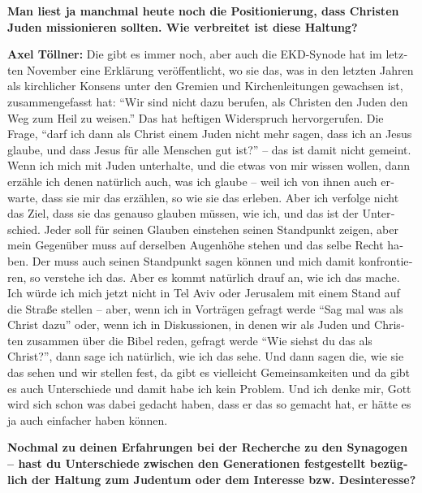 \begin{otherlanguage}{ngerman}
\textbf{Man liest ja manchmal heute noch die Positionierung, dass Christen Juden missionieren sollten. Wie verbreitet ist diese Haltung?} 

\textbf{Axel Töllner:} Die gibt es immer noch, aber auch die EKD-Synode hat im letzten November eine Erklärung veröffentlicht, wo sie das, was in den letzten Jahren als kirchlicher Konsens unter den Gremien und Kirchenleitungen gewachsen ist, zusammengefasst hat: "`Wir sind nicht dazu berufen, als Christen den Juden den Weg zum Heil zu weisen."' Das hat heftigen Widerspruch hervorgerufen. Die Frage, "`darf ich dann als Christ einem Juden nicht mehr sagen, dass ich an Jesus glaube, und dass Jesus für alle Menschen gut ist?"' – das ist damit nicht gemeint. Wenn ich mich mit Juden unterhalte, und die etwas von mir wissen wollen, dann erzähle ich denen natürlich auch, was ich glaube – weil ich von ihnen auch erwarte, dass sie mir das erzählen, so wie sie das erleben. Aber ich verfolge nicht das Ziel, dass sie das genauso glauben müssen, wie ich, und das ist der Unterschied. Jeder soll für seinen Glauben einstehen seinen Standpunkt zeigen, aber mein Gegenüber muss auf derselben Augenhöhe stehen und das selbe Recht haben. Der muss auch seinen Standpunkt sagen können und mich damit konfrontieren, so verstehe ich das.  
Aber es kommt natürlich drauf an, wie ich das mache. Ich würde ich mich jetzt nicht in Tel Aviv oder Jerusalem mit einem Stand auf die Straße stellen – aber, wenn ich in Vorträgen gefragt werde "`Sag mal was als Christ dazu"' oder, wenn ich in Diskussionen, in denen wir als Juden und Christen zusammen über die Bibel reden, gefragt werde "`Wie siehst du das als Christ?"', dann sage ich natürlich, wie ich das sehe. Und dann sagen die, wie sie das sehen und wir stellen fest, da gibt es vielleicht Gemeinsamkeiten und da gibt es auch Unterschiede und damit habe ich kein Problem. Und ich denke mir, Gott wird sich schon was dabei gedacht haben, dass er das so gemacht hat, er hätte es ja auch einfacher haben können.  

\textbf{Nochmal zu deinen Erfahrungen bei der Recherche zu den Synagogen – hast du Unterschiede zwischen den Generationen festgestellt bezüglich der Haltung zum Judentum oder dem Interesse bzw. Desinteresse?} 
 

\end{otherlanguage}
